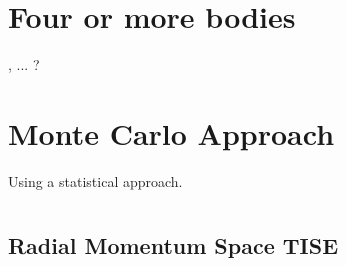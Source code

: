 \documentclass[12pt,a4paper]{report}
\begin{document}
\chapter{Four or more bodies}
\label{cha:four_or_more_bodies}

,  ... ?

\chapter{Monte Carlo Approach}
\label{cha:monte_carlo}

Using a statistical approach.

\appendix

\chapter{}

\section{Radial Momentum Space TISE}
\label{sec:radial_mom_space_TISE}




{}
\end{document}
